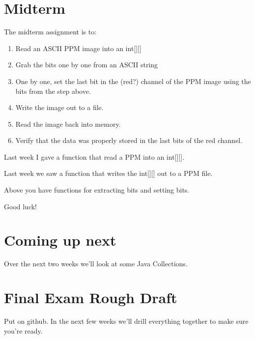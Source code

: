 \documentclass[12pt]{article}
\begin{document}
\section{Midterm}

The midterm assignment is to:
\begin{enumerate}
\item Read an ASCII PPM image into an int[][]
\item Grab the bits one by one from an ASCII string
\item One by one, set the last bit in the (red?) channel of the PPM image using the bits from the step above.
\item Write the image out to a file.
\item Read the image back into memory.
\item Verify that the data was properly stored in the last bits of the red channel.
\end{enumerate}

Last week I gave a function that read a PPM into an int[][]. 

Last week we saw a function that writes the int[][] out to a PPM file.

Above you have functions for extracting bits and setting bits.

Good luck!

\section{Coming up next}
Over the next two weeks we'll look at some Java Collections.

\section{Final Exam Rough Draft}
Put on github. In the next few weeks we'll drill everything together to make sure you're ready.
\end{document}

